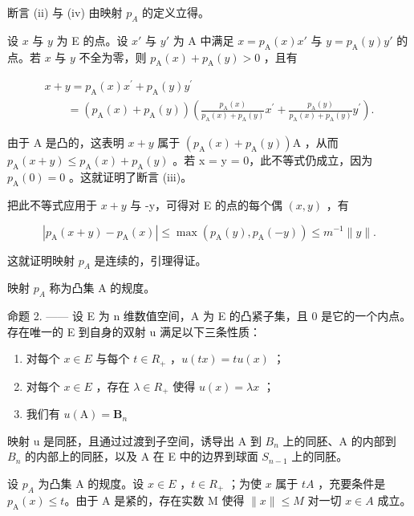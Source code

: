 断言 (ii) 与 (iv) 由映射 \(p_{A}\) 的定义立得。

设 \(x\) 与 \(y\) 为 E 的点。设 \(x'\) 与 \(y'\) 为 A 中满足 \(x = p_{\mathrm{A}}(x)x'\) 与 \(y = p_{\mathrm{A}}(y)y'\) 的点。若 \(x\) 与 \(y\) 不全为零，则 \(p_{\mathrm{A}}(x) + p_{\mathrm{A}}(y) > 0\) ，且有

\[
\begin{array}{l} x + y = p _ {\mathrm{A}} (x) x ^ {\prime} + p _ {\mathrm{A}} (y) y ^ {\prime} \\ \qquad = (p _ {\mathrm{A}} (x) + p _ {\mathrm{A}} (y)) \left(\frac {p _ {\mathrm{A}} (x)}{p _ {\mathrm{A}} (x) + p _ {\mathrm{A}} (y)} x ^ {\prime} + \frac {p _ {\mathrm{A}} (y)}{p _ {\mathrm{A}} (x) + p _ {\mathrm{A}} (y)} y ^ {\prime}\right). \end{array}
\]

由于 A 是凸的，这表明 \(x + y\) 属于 \((p_{\mathrm{A}}(x) + p_{\mathrm{A}}(y))\mathrm{A}\) ，从而 \(p_{\mathrm{A}}(x + y) \leqslant p_{\mathrm{A}}(x) + p_{\mathrm{A}}(y)\) 。若 x = y = 0，此不等式仍成立，因为 \(p_{\mathrm{A}}(0) = 0\) 。这就证明了断言 (iii)。

把此不等式应用于 \(x + y\) 与 -y，可得对 E 的点的每个偶 \((x, y)\) ，有

\[
| p _ {\mathrm{A}} (x + y) - p _ {\mathrm{A}} (x) | \leqslant \max (p _ {\mathrm{A}} (y), p _ {\mathrm{A}} (- y)) \leqslant m ^ {- 1} \| y \|.
\]

这就证明映射 \(p_{A}\) 是连续的，引理得证。

映射 \(p_{A}\) 称为凸集 A 的规度。

命题 2. —— 设 E 为 n 维数值空间，A 为 E 的凸紧子集，且 0 是它的一个内点。存在唯一的 E 到自身的双射 u 满足以下三条性质：

\begin{enumerate}
\def\labelenumi{(\roman{enumi})}
\item
  对每个 \(x \in E\) 与每个 \(t \in R_{+}\) ，\(u(tx) = tu(x)\) ；
\item
  对每个 \(x \in E\) ，存在 \(\lambda \in R_{+}\) 使得 \(u(x) = \lambda x\) ；
\item
  我们有 \(u(\mathrm{A}) = \mathbf{B}_n\)
\end{enumerate}

映射 u 是同胚，且通过过渡到子空间，诱导出 A 到 \(B_{n}\) 上的同胚、A 的内部到 \(B_{n}\) 的内部上的同胚，以及 A 在 E 中的边界到球面 \(S_{n-1}\) 上的同胚。

设 \(p_{A}\) 为凸集 A 的规度。设 \(x \in E\) ，\(t \in R_{+}\) ；为使 \(x\) 属于 \(tA\) ，充要条件是 \(p_{\mathrm{A}}(x) \leqslant t\)。由于 A 是紧的，存在实数 M 使得 \(\|x\| \leqslant M\) 对一切 \(x \in A\) 成立。

